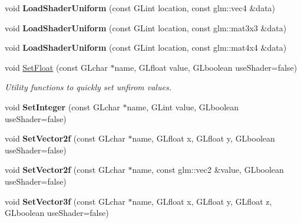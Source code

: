 \begin{DoxyCompactItemize}
\item 
\hypertarget{classDCEngine_1_1Shader_aa367e7da3c16f680f724191c47402006}{void {\bfseries Load\-Shader\-Uniform} (const G\-Lint location, const glm\-::vec4 \&data)}\label{classDCEngine_1_1Shader_aa367e7da3c16f680f724191c47402006}

\item 
\hypertarget{classDCEngine_1_1Shader_a289d3bf025e0c379194d87b2b4367c5d}{void {\bfseries Load\-Shader\-Uniform} (const G\-Lint location, const glm\-::mat3x3 \&data)}\label{classDCEngine_1_1Shader_a289d3bf025e0c379194d87b2b4367c5d}

\item 
\hypertarget{classDCEngine_1_1Shader_a4275762c247c9725c5f39e3952cc1702}{void {\bfseries Load\-Shader\-Uniform} (const G\-Lint location, const glm\-::mat4x4 \&data)}\label{classDCEngine_1_1Shader_a4275762c247c9725c5f39e3952cc1702}

\item 
void \hyperlink{classDCEngine_1_1Shader_ac73777b24c59ba0ede0f70fc7d0867db}{Set\-Float} (const G\-Lchar $\ast$name, G\-Lfloat value, G\-Lboolean use\-Shader=false)
\begin{DoxyCompactList}\small\item\em Utility functions to quickly set unfirom values. \end{DoxyCompactList}\item 
\hypertarget{classDCEngine_1_1Shader_ab682d78bce3ea82de6d7be446c7cb568}{void {\bfseries Set\-Integer} (const G\-Lchar $\ast$name, G\-Lint value, G\-Lboolean use\-Shader=false)}\label{classDCEngine_1_1Shader_ab682d78bce3ea82de6d7be446c7cb568}

\item 
\hypertarget{classDCEngine_1_1Shader_a791bae089e94d974033db14387822e6c}{void {\bfseries Set\-Vector2f} (const G\-Lchar $\ast$name, G\-Lfloat x, G\-Lfloat y, G\-Lboolean use\-Shader=false)}\label{classDCEngine_1_1Shader_a791bae089e94d974033db14387822e6c}

\item 
\hypertarget{classDCEngine_1_1Shader_a50a2fd2e5e483ac4e0bc6d4a7857d795}{void {\bfseries Set\-Vector2f} (const G\-Lchar $\ast$name, const glm\-::vec2 \&value, G\-Lboolean use\-Shader=false)}\label{classDCEngine_1_1Shader_a50a2fd2e5e483ac4e0bc6d4a7857d795}

\item 
\hypertarget{classDCEngine_1_1Shader_a7c49da245808e081210a5e76ed7427ce}{void {\bfseries Set\-Vector3f} (const G\-Lchar $\ast$name, G\-Lfloat x, G\-Lfloat y, G\-Lfloat z, G\-Lboolean use\-Shader=false)}\label{classDCEngine_1_1Shader_a7c49da245808e081210a5e76ed7427ce}


\end{DoxyCompactItemize}
